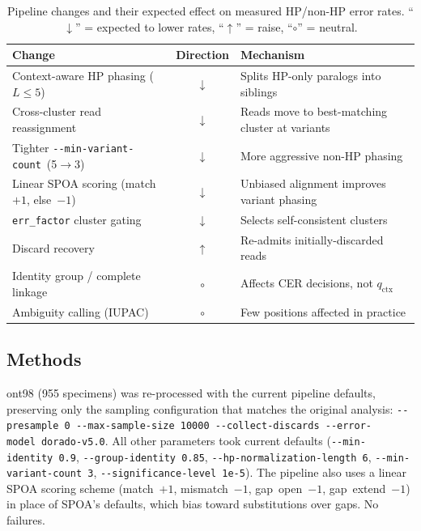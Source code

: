 \documentclass[11pt]{article}
\begin{document}
\begin{table}[h]
\centering
\caption{Pipeline changes and their expected effect on measured HP/non-HP
error rates. ``$\downarrow$'' = expected to lower rates, ``$\uparrow$'' = raise,
``$\circ$'' = neutral.}
\label{tab:pipeline_changes}
\small
\begin{tabular}{lcl}
\toprule
Change & Direction & Mechanism \\
\midrule
Context-aware HP phasing ($L\leq5$) & $\downarrow$ & Splits HP-only paralogs into siblings \\
Cross-cluster read reassignment & $\downarrow$ & Reads move to best-matching cluster at variants \\
Tighter \texttt{-{}-min-variant-count}\ (5$\to$3) & $\downarrow$ & More aggressive non-HP phasing \\
Linear SPOA scoring (match~$+1$, else~$-1$) & $\downarrow$ & Unbiased alignment improves variant phasing \\
\texttt{err\_factor} cluster gating & $\downarrow$ & Selects self-consistent clusters \\
\midrule
Discard recovery & $\uparrow$ & Re-admits initially-discarded reads \\
\midrule
Identity group / complete linkage & $\circ$ & Affects CER decisions, not $q_\text{ctx}$ \\
Ambiguity calling (IUPAC) & $\circ$ & Few positions affected in practice \\
\bottomrule
\end{tabular}
\end{table}

\subsection{Methods}

ont98 (955 specimens) was re-processed with the current pipeline defaults,
preserving only the sampling configuration that matches the original
analysis:
\texttt{-{}-presample~0 -{}-max-sample-size~10000 -{}-collect-discards
-{}-error-model~dorado-v5.0}. All other parameters took current defaults
(\texttt{-{}-min-identity~0.9}, \texttt{-{}-group-identity~0.85},
\texttt{-{}-hp-normalization-length~6}, \texttt{-{}-min-variant-count~3},
\texttt{-{}-significance-level~1e-5}). The pipeline also uses a linear
SPOA scoring scheme (match~$+1$, mismatch~$-1$, gap~open~$-1$,
gap~extend~$-1$) in place of SPOA's defaults, which bias toward
substitutions over gaps. No failures.
\end{document}
